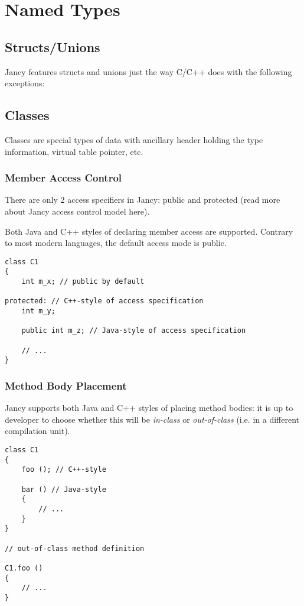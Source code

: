 \documentclass[oneside]{book}
\begin{document}
\section{Named Types}

\subsection{Structs/Unions}

Jancy features structs and unions just the way C/C++ does with the following exceptions:




\subsection{Classes}

Classes are special types of data with ancillary header holding the type information, virtual table pointer, etc.

\subsubsection{Member Access Control}

There are only 2 access specifiers in Jancy: public and protected (read more about Jancy access control model here).

Both Java and C++ styles of declaring member access are supported. Contrary to most modern languages, the default access mode is public.

\begin{lstlisting}
class C1
{
    int m_x; // public by default

protected: // C++-style of access specification
    int m_y;

    public int m_z; // Java-style of access specification

    // ...
}
\end{lstlisting}

\subsubsection{Method Body Placement}

Jancy supports both Java and C++ styles of placing method bodies: it is up to developer to choose whether this will be \emph{in-class} or \emph{out-of-class} (i.e. in a different compilation unit).

\begin{lstlisting}
class C1 
{
    foo (); // C++-style

    bar () // Java-style
    {
        // ...
    }
}

// out-of-class method definition

C1.foo ()
{
    // ...
}
\end{lstlisting}
\end{document}
